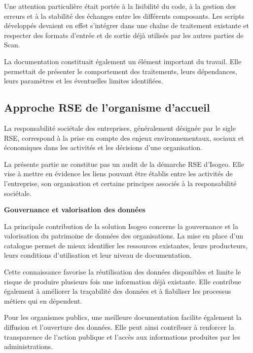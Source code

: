 Une attention particulière était portée à la lisibilité du code, à la gestion
des erreurs et à la stabilité des échanges entre les différents composants.
Les scripts développés devaient en effet s'intégrer dans une chaîne de
traitement existante et respecter des formats d'entrée et de sortie déjà
utilisés par les autres parties de Scan.

La documentation constituait également un élément important du travail. Elle
permettait de présenter le comportement des traitements, leurs dépendances,
leurs paramètres et les éventuelles limites identifiées.


\subsection{Approche RSE de l'organisme d'accueil}
\label{subsec:approche_rse}

La responsabilité sociétale des entreprises, généralement désignée par le
sigle RSE, correspond à la prise en compte des enjeux environnementaux, sociaux
et économiques dans les activités et les décisions d'une organisation.

La présente partie ne constitue pas un audit de la démarche RSE d'Isogeo. Elle
vise à mettre en évidence les liens pouvant être établis entre les activités
de l'entreprise, son organisation et certains principes associés à la
responsabilité sociétale.

\medskip

\noindent
\textbf{Gouvernance et valorisation des données}

\medskip

La principale contribution de la solution Isogeo concerne la gouvernance et la
valorisation du patrimoine de données des organisations. La mise en place d'un
catalogue permet de mieux identifier les ressources existantes, leurs
producteurs, leurs conditions d'utilisation et leur niveau de documentation.

Cette connaissance favorise la réutilisation des données disponibles et limite
le risque de produire plusieurs fois une information déjà existante. Elle
contribue également à améliorer la traçabilité des données et à fiabiliser les
processus métiers qui en dépendent.

Pour les organismes publics, une meilleure documentation facilite également la
diffusion et l'ouverture des données. Elle peut ainsi contribuer à renforcer
la transparence de l'action publique et l'accès aux informations produites par
les administrations.

